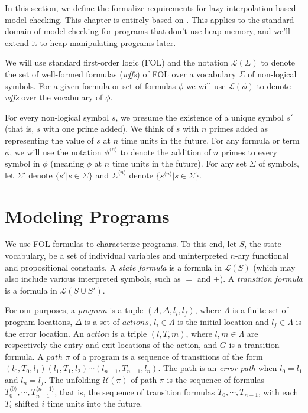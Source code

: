\label{ch:background}

In this section, we define the formalize requirements for lazy interpolation-based model checking. This chapter is entirely based on \cite{mcmillan06}. This applies to the standard domain of model checking for programs that don't use heap memory, and we'll extend it to heap-manipulating programs later.

We will use standard first-order logic (FOL) and the notation $\mathcal{L}(\Sigma)$ to denote the set of well-formed formulas (\textit{wffs}) of FOL over a vocabulary $\Sigma$ of non-logical symbols. For a given formula or set of formulas $\phi$ we will use $\mathcal{L}(\phi)$ to denote \textit{wffs} over the vocabulary of $\phi$.

For every non-logical symbol $s$, we presume the existence of a unique symbol $s'$ (that is, $s$ with one prime added). We think of $s$ with $n$ primes added as representing the value of $s$ at $n$ time units in the future. For any formula or term $\phi$, we will use the notation $\phi^{\langle n \rangle}$ to denote the addition of $n$ primes to every symbol in $\phi$ (meaning $\phi$ at $n$ time units in the future). For any set $\Sigma$ of symbols, let $\Sigma'$ denote $\{ s' | s \in \Sigma \}$ and $\Sigma^{\langle n \rangle}$ denote $\{ s^{\langle n \rangle} | s \in \Sigma \}$.

\section{Modeling Programs}
\label{sec:modeling-programs}

We use FOL formulas to characterize programs. To this end, let $S$, the state vocabulary, be a set of individual variables and uninterpreted $n$-ary functional and propositional constants. A \textit{state formula} is a formula in $\mathcal{L}(S)$ (which may also include various interpreted symbols, such as $=$ and $+$). A \textit{transition formula} is a formula in $\mathcal{L}(S \cup S')$.

For our purposes, a \textit{program} is a tuple $(\Lambda, \Delta, l_i, l_f)$, where $\Lambda$ is a finite set of program locations, $\Delta$ is a set of $actions$, $l_i \in \Lambda$ is the initial location and $l_f \in \Lambda$ is the error location. An $action$ is a triple $(l, T, m)$, where $l,m \in \Lambda$ are respectively the entry and exit locations of the action, and $G$ is a transition formula. A $path$ $\pi$ of a program is a sequence of transitions of the form $(l_0, T_0, l_1)(l_1, T_1, l_2) \cdots (l_{n-1}, T_{n-1}, l_n)$. The path is an \textit{error path} when $l_0 = l_1$ and $l_n = l_f$. The unfolding $\mathcal{U}(\pi)$ of path $\pi$ is the sequence of formulas $T_0^{\langle 0 \rangle}, \cdots, T_{n-1}^{\langle n-1 \rangle}$, that is, the sequence of transition formulas $T_0, \cdots, T_{n-1}$, with each $T_i$ shifted $i$ time units into the future.

